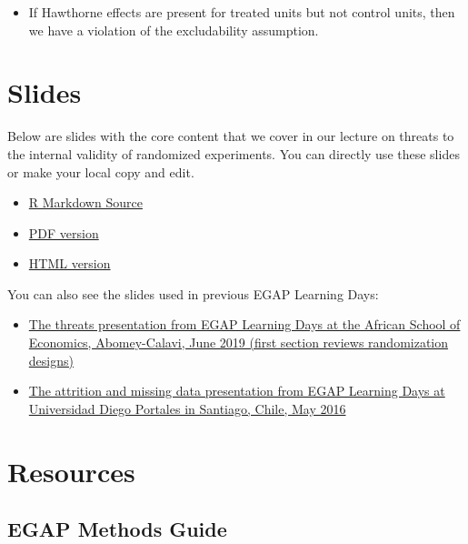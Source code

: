 \documentclass[12pt,]{book}
\providecommand{\tightlist}{%
  \setlength{\itemsep}{0pt}\setlength{\parskip}{0pt}}
\begin{document}
\begin{itemize}
  \begin{itemize}
  \tightlist
  \item
    If Hawthorne effects are present for treated units but not control units, then we have a violation of the excludability assumption.
  \end{itemize}
\end{itemize}

\hypertarget{slides-7}{%
\section{Slides}\label{slides-7}}

Below are slides with the core content that we cover in our lecture on threats to the internal validity of randomized experiments. You can directly use these slides or make your local copy and edit.

\begin{itemize}
\item
  \href{https://egap.github.io/learningdays-resources/Slides/threats-slides.Rmd}{R Markdown Source}
\item
  \href{https://egap.github.io/learningdays-resources/Slides/threats-slides.pdf}{PDF version}
\item
  \href{https://egap.github.io/learningdays-resources/Slides/threats-slides.html}{HTML version}
\end{itemize}

You can also see the slides used in previous EGAP Learning Days:

\begin{itemize}
\item
  \href{https://egap.github.io/learningdays-resources/Slides/Examples/threats-benin.pdf}{The threats presentation from EGAP Learning Days at the African School of Economics, Abomey-Calavi, June 2019 (first section reviews randomization designs)}
\item
  \href{https://egap.github.io/learningdays-resources/Slides/Examples/threats-santiago.pdf}{The attrition and missing data presentation from EGAP Learning Days at Universidad Diego Portales in Santiago, Chile, May 2016}
\end{itemize}

\hypertarget{resources-7}{%
\section{Resources}\label{resources-7}}

\hypertarget{egap-methods-guide}{%
\subsection{EGAP Methods Guide}\label{egap-methods-guide}}
\end{document}
